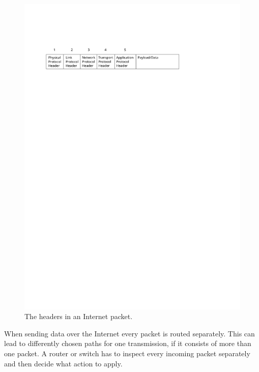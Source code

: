 \documentclass[a4paper,
		12pt,
		parskip=full,
		titlepage
		]{scrartcl}
\begin{document}
\begin{figure}
\centering
\includegraphics[width=\textwidth]{images/packet-headers}
\caption{The headers in an Internet packet.}
\label{fig:packet-headers}
\end{figure}

When sending data over the Internet every packet is routed separately.
This can lead to differently chosen paths for one transmission, if it consists of more than one packet.
A router or switch has to inspect every incoming packet separately and then decide what action to apply.
\end{document}
